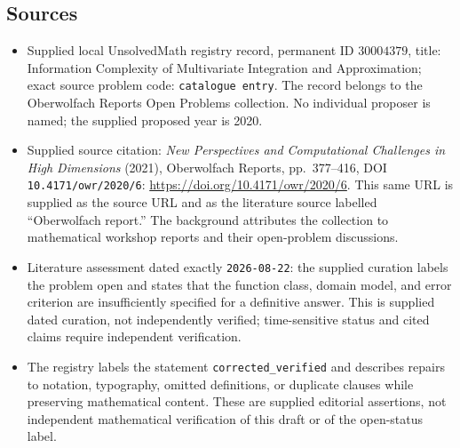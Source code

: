 \documentclass[11pt]{article}
\begin{document}
\subsection{Sources}
\begin{itemize}
\item Supplied local UnsolvedMath registry record, permanent ID \(30004379\), title: Information Complexity of Multivariate Integration and Approximation; exact source problem code: \texttt{catalogue entry}. The record belongs to the Oberwolfach Reports Open Problems collection. No individual proposer is named; the supplied proposed year is 2020.
\item Supplied source citation: \emph{New Perspectives and Computational Challenges in High Dimensions} (2021), Oberwolfach Reports, pp.\ 377--416, DOI \texttt{10.4171/owr/2020/6}: \url{https://doi.org/10.4171/owr/2020/6}. This same URL is supplied as the source URL and as the literature source labelled ``Oberwolfach report.'' The background attributes the collection to mathematical workshop reports and their open-problem discussions.
\item Literature assessment dated exactly \texttt{2026-08-22}: the supplied curation labels the problem open and states that the function class, domain model, and error criterion are insufficiently specified for a definitive answer. This is supplied dated curation, not independently verified; time-sensitive status and cited claims require independent verification.
\item The registry labels the statement \texttt{corrected\_verified} and describes repairs to notation, typography, omitted definitions, or duplicate clauses while preserving mathematical content. These are supplied editorial assertions, not independent mathematical verification of this draft or of the open-status label.
\end{itemize}
\end{document}
